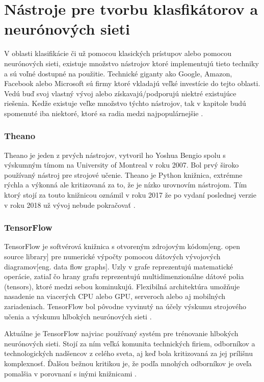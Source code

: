 
\section{Nástroje pre tvorbu klasfikátorov a neurónových sieti}
\label{sec:frameworks}
V oblasti klasifikácie či už pomocou klasických prístupov alebo pomocou neurónových sieti, existuje množstvo nástrojov
    ktoré implementujú tieto techniky a sú voľné dostupné na použitie.
Technické giganty ako Google, Amazon, Facebook alebo Microsoft sú firmy ktoré vkladajú veľké investície do tejto oblasti.
Vedú buď svoj vlastný vývoj alebo získavajú/podporujú niektré existujúce riešenia.
Kedže existuje veľke množstvo týchto nástrojov, tak v kapitole budú spomenuté iba niektoré, ktoré sa radia medzi najpopulárnejšie \cite{odkaz:FrameworkComparison}.

\subsubsection{Theano}

Theano je jeden z prvých nástrojov, vytvoril ho Yoshua Bengio spolu s výskumným tímom na University of Montreal v roku 2007.
Bol prvý široko používaný nástroj pre strojové učenie.
Theano je Python knižnica, extrémne rýchla a výkonná ale kritizovaná za to, že je nízko urovnovím nástrojom.
Tím ktorý stojí za touto knižnicou oznámil v roku 2017 že po vydaní poslednej verzie v roku 2018 už vývoj nebude pokračovať \cite{odkaz:FrameworkComparison}.

\subsubsection{TensorFlow}

TensorFlow je softvérová knižnica s otvoreným zdrojovým kódom[eng. open source library] pre numerické výpočty pomocou dátových vývojových diagramov[eng. data flow graphs].
Uzly v grafe reprezentujú matematické operácie, zatiaľ čo hrany grafu reprezentujú multidimenzionálne dátové polia (tensors), ktoré medzi sebou kominukujú.
Flexibilná architektúra umožňuje nasadenie na viacerých CPU alebo GPU, serveroch alebo aj mobilných zariadeniach.
TensorFlow bol pôvodne vyvinutý na účely výskumu strojového učenia a výskumu hlbokých neurónových sieti \cite{odkaz:TensorFlow}.

Aktuálne je TensorFlow najviac používaný systém pre trénovanie hlbokých neurónových sieti.
Stojí za ním veľká komunita technických firiem, odborníkov a technologických nadšencov z celého sveta, aj keď bola kritizovaná za jej prílišnu komplexnosť.
Ďalšou bežnou kritikou je, že podľa mnohých odborníkov je oveľa pomalšia v porovnaní s inými knižnicami \cite{odkaz:FrameworkComparison}.

